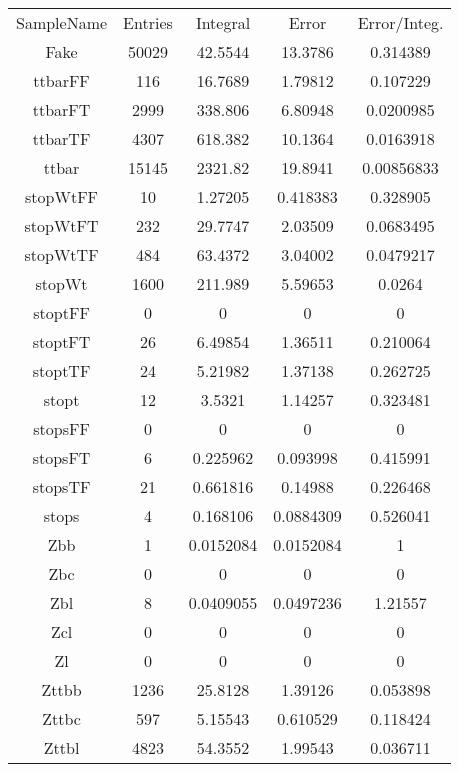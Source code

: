 \begin{table}
\centering
\begin{tabular}{|c|c|c|c|c|}
\hline
\hline
SampleName & Entries & Integral & Error    & Error/Integ.\\
Fake       & 50029   & 42.5544  & 13.3786  & 0.314389\\
ttbarFF    & 116     & 16.7689  & 1.79812  & 0.107229\\
ttbarFT    & 2999    & 338.806  & 6.80948  & 0.0200985\\
ttbarTF    & 4307    & 618.382  & 10.1364  & 0.0163918\\
ttbar      & 15145   & 2321.82  & 19.8941  & 0.00856833\\
stopWtFF   & 10      & 1.27205  & 0.418383 & 0.328905\\
stopWtFT   & 232     & 29.7747  & 2.03509  & 0.0683495\\
stopWtTF   & 484     & 63.4372  & 3.04002  & 0.0479217\\
stopWt     & 1600    & 211.989  & 5.59653  & 0.0264\\
stoptFF    & 0       & 0        & 0        & 0\\
stoptFT    & 26      & 6.49854  & 1.36511  & 0.210064\\
stoptTF    & 24      & 5.21982  & 1.37138  & 0.262725\\
stopt      & 12      & 3.5321   & 1.14257  & 0.323481\\
stopsFF    & 0       & 0        & 0        & 0\\
stopsFT    & 6       & 0.225962 & 0.093998 & 0.415991\\
stopsTF    & 21      & 0.661816 & 0.14988  & 0.226468\\
stops      & 4       & 0.168106 & 0.0884309& 0.526041\\
Zbb        & 1       & 0.0152084& 0.0152084& 1\\
Zbc        & 0       & 0        & 0        & 0\\
Zbl        & 8       & 0.0409055& 0.0497236& 1.21557\\
Zcl        & 0       & 0        & 0        & 0\\
Zl         & 0       & 0        & 0        & 0\\
Zttbb      & 1236    & 25.8128  & 1.39126  & 0.053898\\
Zttbc      & 597     & 5.15543  & 0.610529 & 0.118424\\
Zttbl      & 4823    & 54.3552  & 1.99543  & 0.036711\\

\end{tabular}
\end{table}
